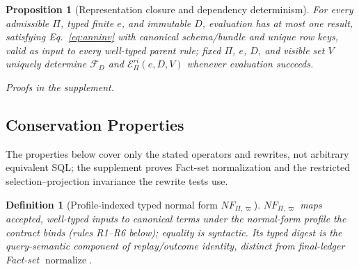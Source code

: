 \documentclass[10pt,journal,compsoc]{IEEEtran}
\newcommand{\facts}{\mathcal{F}}
\newcommand{\rieffect}{\mathcal{E}^{ri}}
\newtheorem{definition}{Definition}
\newtheorem{proposition}{Proposition}
\begin{document}
\begin{proposition}[Representation closure and dependency determinism]
\label{thm:representation-closure}
For every admissible $\Pi$, typed finite $e$, and immutable $D$, evaluation
has at most one result, satisfying Eq.~\eqref{eq:anninv} with canonical
schema/bundle and unique row keys, valid as input to every well-typed
parent rule; fixed $\Pi$, $e$, $D$, and visible set $V$ uniquely determine
$\facts_D$ and $\rieffect_\Pi(e,D,V)$ whenever evaluation succeeds.
\end{proposition}
\emph{Proofs in the supplement.}


\subsection{Conservation Properties}

The properties below cover only the stated operators and rewrites, not
arbitrary equivalent SQL; the supplement proves Fact-set normalization and the
restricted selection--projection invariance the rewrite tests use.

\begin{definition}[Profile-indexed typed normal form $NF_{\Pi,\varpi}$]
\label{def:nf}
$NF_{\Pi,\varpi}$ maps accepted, well-typed inputs to canonical terms under
the normal-form profile the contract binds (rules R1--R6 below);
equality is syntactic. Its typed digest is the query-semantic component of
replay/outcome identity, distinct from final-ledger Fact-set
$\operatorname{normalize}$.
\end{definition}
\end{document}

